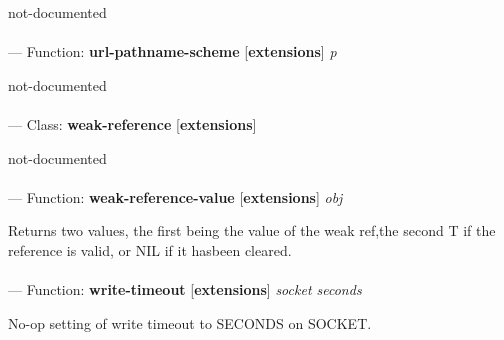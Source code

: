 \begin{adjustwidth}{5em}{5em}
not-documented
\end{adjustwidth}

\paragraph{}
\label{EXTENSIONS:URL-PATHNAME-SCHEME}
--- Function: \textbf{url-pathname-scheme} [\textbf{extensions}] \textit{p}

\begin{adjustwidth}{5em}{5em}
not-documented
\end{adjustwidth}

\paragraph{}
\label{EXTENSIONS:WEAK-REFERENCE}
--- Class: \textbf{weak-reference} [\textbf{extensions}] \textit{}

\begin{adjustwidth}{5em}{5em}
not-documented
\end{adjustwidth}

\paragraph{}
\label{EXTENSIONS:WEAK-REFERENCE-VALUE}
--- Function: \textbf{weak-reference-value} [\textbf{extensions}] \textit{obj}

\begin{adjustwidth}{5em}{5em}
Returns two values, the first being the value of the weak ref,the second T if the reference is valid, or NIL if it hasbeen cleared.
\end{adjustwidth}

\paragraph{}
\label{EXTENSIONS:WRITE-TIMEOUT}
--- Function: \textbf{write-timeout} [\textbf{extensions}] \textit{socket seconds}

\begin{adjustwidth}{5em}{5em}
No-op setting of write timeout to SECONDS on SOCKET.
\end{adjustwidth}

